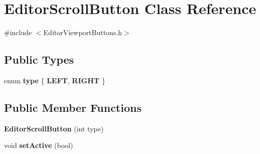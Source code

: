 \hypertarget{classEditorScrollButton}{\section{Editor\-Scroll\-Button Class Reference}
\label{classEditorScrollButton}
}


{\ttfamily \#include $<$Editor\-Viewport\-Buttons.\-h$>$}

\subsection*{Public Types}
\begin{DoxyCompactItemize}
\item 
enum {\bfseries type} \{ {\bfseries L\-E\-F\-T}, 
{\bfseries R\-I\-G\-H\-T}
 \}
\end{DoxyCompactItemize}
\subsection*{Public Member Functions}
\begin{DoxyCompactItemize}
\item 
\hypertarget{classEditorScrollButton_a5fb520c9d69a64445237b4460f5f3996}{{\bfseries Editor\-Scroll\-Button} (int type)}\label{classEditorScrollButton_a5fb520c9d69a64445237b4460f5f3996}

\item 
\hypertarget{classEditorScrollButton_afa1c06306541020c5357ca73b0e5afe7}{void {\bfseries set\-Active} (bool)}\label{classEditorScrollButton_afa1c06306541020c5357ca73b0e5afe7}

\end{DoxyCompactItemize}
